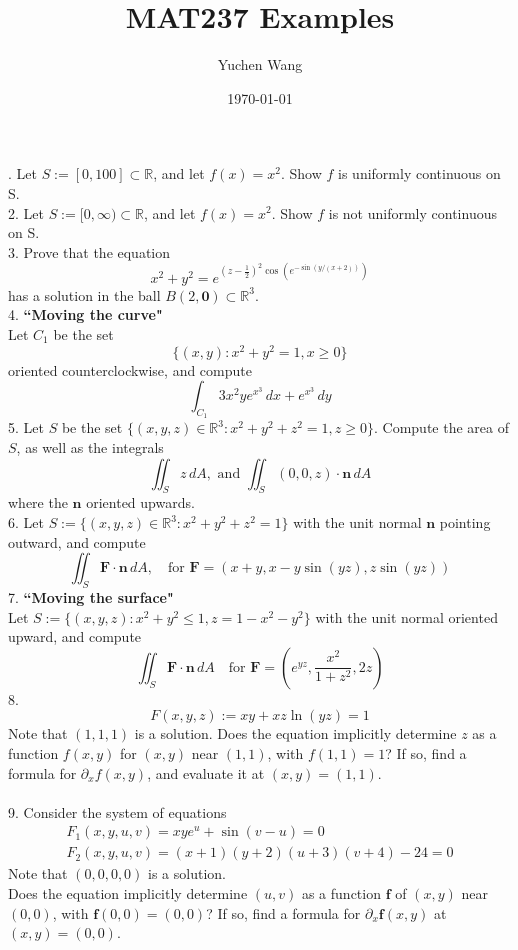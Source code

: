 \documentclass[11pt]{article}
\title{MAT237 Examples}
\author{Yuchen Wang}
\date{\today}
\newcommand{\tb}[1]{\textbf{#1}}
\newcommand{\real}[0]{\mathbb{R}}
\newcommand{\vo}[0]{\tb{0}}
\newcommand{\vf}[0]{\tb{F}}
\newcommand{\vn}[0]{\tb{n}}
\newcommand{\ff}[0]{\tb{f}}
\newcommand{\p}[0]{\partial}
\begin{document}
    \maketitle
{}. Let $S:= [0, 100] \subset \real$, and let $f(x) = x^2$. Show $f$ is uniformly continuous on S. \\
2. Let $S:= [0, \infty) \subset \real$, and let $f(x) = x^2$. Show $f$ is not uniformly continuous on S. \\
3. Prove that the equation $$x^2 + y^2 = e^{(z-\frac{1}{2})^2 \cos(e^{-\sin(y/(x+2))})}$$
has a solution in the ball $B(2, \vo) \subset \real^3$. \\
4. \tb{``Moving the curve"} \\
Let $C_1$ be the set $$\{(x,y): x^2+y^2 = 1, x \geq 0\}$$ oriented counterclockwise, and compute
$$\int_{C_1} 3x^2ye^{x^3}\,dx + e^{x^3}\,dy$$
5. Let $S$ be the set $\{(x,y,z) \in \real^3: x^2 + y^2 + z^2 = 1, z \geq 0\}$. Compute the area of $S$, as well as the integrals
$$\iint_S z \, dA, \mbox{ and }\iint_S (0,0,z) \cdot \vn\, dA$$
where the $\vn$ oriented upwards. \\
6. Let $S:= \{(x,y,z) \in \real^3: x^2 + y^2 + z^2 = 1\}$ with the unit normal $\vn$ pointing outward, and compute
$$\iint_S \vf \cdot \vn \, dA, \quad \mbox{for } \vf = (x+y, x-y\sin(yz), z\sin(yz))$$
7. \tb{``Moving the surface"}\\
Let $S:= \{(x,y,z): x^2 + y^2 \leq 1, z = 1 - x^2 - y^2\}$ with the unit normal oriented upward, and compute
$$\iint_S \vf \cdot \vn \, dA \quad \mbox{for } \vf = (e^{yz}, \frac{x^2}{1+z^2}, 2z)$$
8. $$F(x,y,z) := xy + xz\ln(yz) = 1$$
Note that $(1,1,1)$ is a solution. Does the equation implicitly determine $z$ as a function $f(x,y)$ for $(x,y)$ near $(1,1)$, with $f(1,1) = 1$? If so, find a formula for $\p_x f(x,y)$, and evaluate it at $(x,y) = (1,1)$.\\\\
9. Consider the system of equations
\begin{align*}
	F_1(x,y,u,v) = xye^u + \sin(v-u) = 0\\
	F_2(x,y,u,v) = (x+1)(y+2)(u+3)(v+4) - 24 = 0
\end{align*}
Note that $(0,0,0,0)$ is a solution.\\
Does the equation implicitly determine $(u,v)$ as a function $\ff$ of $(x,y)$ near $(0,0)$, with $\ff(0,0) = (0,0)$? If so, find a formula for $\p_x \ff(x,y)$ at $(x,y) = (0,0)$.
\end{document}

